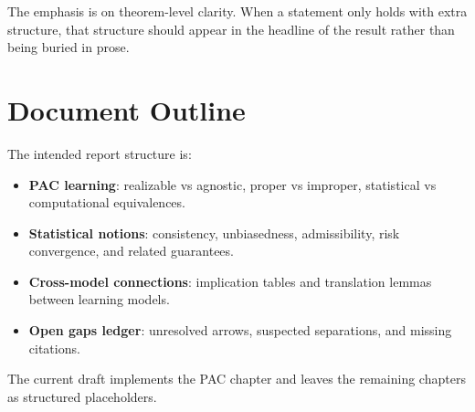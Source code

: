 The emphasis is on theorem-level clarity. When a statement only holds with extra structure, that structure should appear in the headline of the result rather than being buried in prose.

\section{Document Outline}

The intended report structure is:

\begin{itemize}
\item \textbf{PAC learning}: realizable vs agnostic, proper vs improper, statistical vs computational equivalences.
\item \textbf{Statistical notions}: consistency, unbiasedness, admissibility, risk convergence, and related guarantees.
\item \textbf{Cross-model connections}: implication tables and translation lemmas between learning models.
\item \textbf{Open gaps ledger}: unresolved arrows, suspected separations, and missing citations.
\end{itemize}

The current draft implements the PAC chapter and leaves the remaining chapters as structured placeholders.
